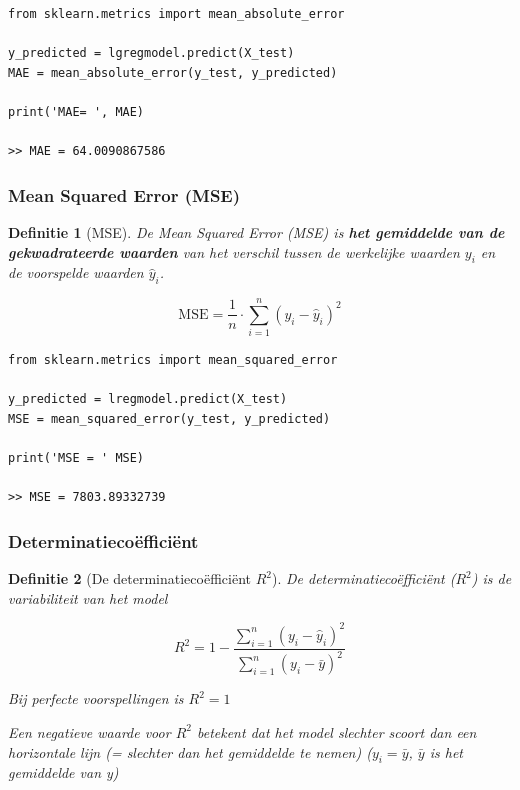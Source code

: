 \documentclass{article}
\newtheorem{theorem}{Definitie}[section]
\begin{document}
\begin{verbatim}
from sklearn.metrics import mean_absolute_error

y_predicted = lgregmodel.predict(X_test)
MAE = mean_absolute_error(y_test, y_predicted)

print('MAE= ', MAE)

>> MAE = 64.0090867586

\end{verbatim}

\subsubsection{Mean Squared Error (MSE)}

\begin{theorem}[MSE]
De Mean Squared Error (MSE) is \textbf{het gemiddelde van de gekwadrateerde waarden} van het verschil tussen de werkelijke waarden $y_i$ en
de voorspelde waarden $\hat{y}_i$.

\begin{equation}
\text{MSE} = \frac{1}{n} \cdot \sum_{i=1}^n ( y_i - \hat{y}_i )^2
\end{equation}
\end{theorem}

\begin{verbatim}
from sklearn.metrics import mean_squared_error

y_predicted = lregmodel.predict(X_test)
MSE = mean_squared_error(y_test, y_predicted)

print('MSE = ' MSE)

>> MSE = 7803.89332739
\end{verbatim}


\subsubsection{Determinatiecoëfficiënt}

\begin{theorem}[De determinatiecoëfficiënt $R^2$]
De determinatiecoëfficiënt ($R^2$) is de variabiliteit van het model

\begin{equation}
R^2 = 1 - \frac{\sum_{i=1}^n (y_i - \hat{y}_i)^2 }{\sum_{i=1}^n (y_i - \bar{y})^2}
\end{equation}

Bij perfecte voorspellingen is $R^2 = 1$

Een negatieve waarde voor $R^2$ betekent dat het model slechter scoort dan een horizontale lijn (= slechter dan het gemiddelde te nemen) ($y_i = \bar{y}$, $\bar{y}$ is het gemiddelde van y)
\end{theorem}
\end{document}
